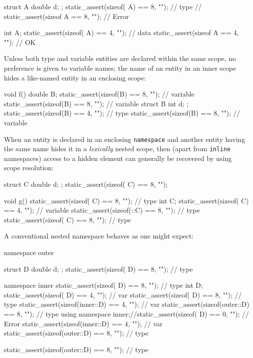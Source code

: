 \begin{emcppslisting}
struct A { double d; };  static_assert(sizeof(  A) == 8, "");  // type
                      // static_assert(sizeof   A  == 8, "");  // Error

int A;                   static_assert(sizeof(  A) == 4, "");  // data
                         static_assert(sizeof   A  == 4, "");  // OK
\end{emcppslisting}
    
\noindent Unless both type and variable entities are declared within the same
scope, no preference is given to variable names; the name of an entity
in an inner scope hides a like-named entity in an enclosing scope:

\begin{emcppslisting}
void f()
{
    double B;                 static_assert(sizeof(B) == 8, "");  // variable
    {                         static_assert(sizeof(B) == 8, "");  // variable
        struct B { int d; };  static_assert(sizeof(B) == 4, "");  // type
    }                         static_assert(sizeof(B) == 8, "");  // variable
}
\end{emcppslisting}
    
\noindent When an entity is declared in an enclosing \lstinline!namespace! and
another entity having the same name hides it in a \emph{lexically}
nested scope, then (apart from \lstinline!inline! namespaces) access to a
hidden element can generally be recovered by using scope resolution:

\begin{emcppslisting}
struct C { double d; };  static_assert(sizeof(  C) == 8, "");

void g()
{                        static_assert(sizeof(  C) == 8, "");  // type
    int C;               static_assert(sizeof(  C) == 4, "");  // variable
                         static_assert(sizeof(::C) == 8, "");  // type
}                        static_assert(sizeof(  C) == 8, "");  // type
\end{emcppslisting}
    
\noindent A conventional nested namespace behaves as one might expect:

\begin{emcppslisting}
namespace outer
{
    struct D { double d; }; static_assert(sizeof(       D) == 8, ""); // type

    namespace inner
    {                       static_assert(sizeof(       D) == 8, ""); // type
        int D;              static_assert(sizeof(       D) == 4, ""); // var
    }                       static_assert(sizeof(       D) == 8, ""); // type
                            static_assert(sizeof(inner::D) == 4, ""); // var
                            static_assert(sizeof(outer::D) == 8, ""); // type
    using namespace inner;//static_assert(sizeof(       D) == 0, ""); // Error
                            static_assert(sizeof(inner::D) == 4, ""); // var
                            static_assert(sizeof(outer::D) == 8, ""); // type
}                           static_assert(sizeof(outer::D) == 8, ""); // type
\end{emcppslisting}
    
